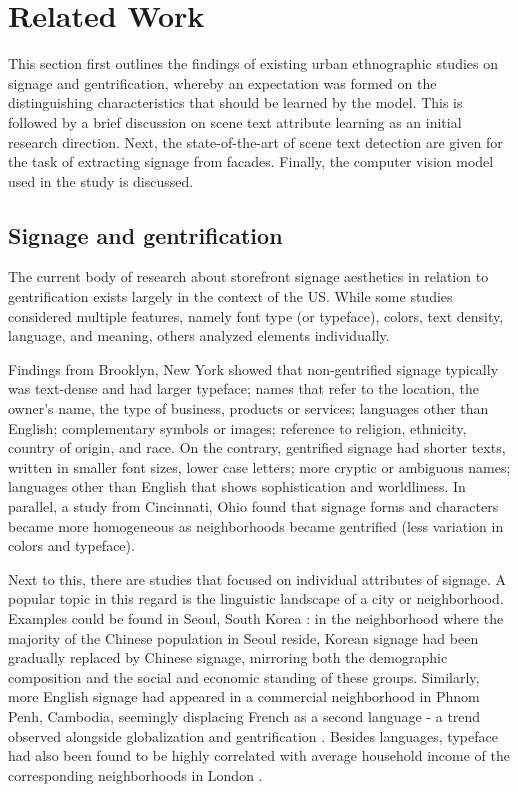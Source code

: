 \section{Related Work}
\label{sec:related_work}

This section first outlines the findings of existing urban ethnographic studies on signage and gentrification, whereby an expectation was formed on the distinguishing characteristics that should be learned by the model. This is followed by a brief discussion on scene text attribute learning as an initial research direction. Next, the state-of-the-art of scene text detection are given for the task of extracting signage from facades. Finally, the computer vision model used in the study is discussed.

\subsection{Signage and gentrification}

The current body of research about storefront signage aesthetics in relation to gentrification exists largely in the context of the US. While some studies considered multiple features, namely font type (or typeface), colors, text density, language, and meaning, others analyzed elements individually.

Findings from Brooklyn, New York\cite{trinch_signsays_2017, snajdr_oldschool_2018, snajdr_preserve_2022} showed that non-gentrified signage typically was text-dense and had larger typeface; names that refer to the location, the owner's name, the type of business, products or services; languages other than English; complementary symbols or images; reference to religion, ethnicity, country of origin, and race. On the contrary, gentrified signage had shorter texts, written in smaller font sizes, lower case letters; more cryptic or ambiguous names; languages other than English that shows sophistication and worldliness. In parallel, a study from Cincinnati, Ohio \cite{rahman_signage_2020} found that signage forms and characters became more homogeneous as neighborhoods became gentrified (less variation in colors and typeface).

Next to this, there are studies that focused on individual attributes of signage. A popular topic in this regard is the linguistic landscape of a city or neighborhood. Examples could be found in Seoul, South Korea \cite{hong_linguistic_2020}: in the neighborhood where the majority of the Chinese population in Seoul reside, Korean signage had been gradually replaced by Chinese signage, mirroring both the demographic composition and the social and economic standing of these groups. Similarly, more English signage had appeared in a commercial neighborhood in Phnom Penh, Cambodia, seemingly displacing French as a second language - a trend observed alongside globalization and gentrification \cite{kasanga_map_2012}. Besides languages, typeface had also been found to be highly correlated with average household income of the corresponding neighborhoods in London \cite{ma_typef_2019}.

